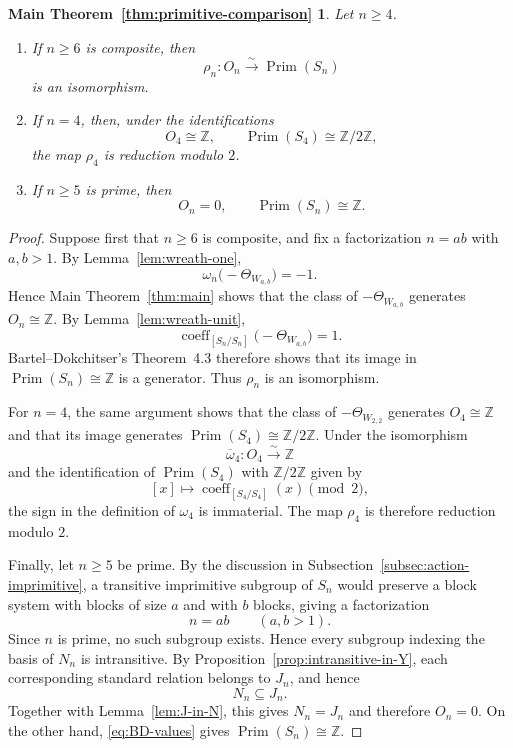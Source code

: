\documentclass[a4paper,11pt]{article}
\numberwithin{equation}{section}
\newtheorem*{primitivecomparisonrestated}{Main Theorem~\ref{thm:primitive-comparison}}
\newcommand{\Z}{\mathbb{Z}}
\newcommand{\Prim}{\operatorname{Prim}}
\newcommand{\coeff}{\operatorname{coeff}}
\begin{document}
\begin{primitivecomparisonrestated}
Let $n\ge4$.
\begin{enumerate}[label=\textup{(\roman*)},leftmargin=3em,labelsep=0.6em]
\item If $n\ge6$ is composite, then
\[
  \rho_n:O_n\xrightarrow{\sim}\Prim(S_n)
\]
is an isomorphism.
\item If $n=4$, then, under the identifications
\[
  O_4\cong\Z,
  \qquad
  \Prim(S_4)\cong\Z/2\Z,
\]
the map $\rho_4$ is reduction modulo $2$.
\item If $n\ge5$ is prime, then
\[
  O_n=0,
  \qquad
  \Prim(S_n)\cong\Z.
\]
\end{enumerate}
\end{primitivecomparisonrestated}

\begin{proof}
Suppose first that $n\ge6$ is composite, and fix a factorization $n=ab$ with
$a,b>1$. By Lemma~\ref{lem:wreath-one},
\[
  \omega_n\bigl(-\Theta_{W_{a,b}}\bigr)=-1.
\]
Hence Main Theorem~\ref{thm:main} shows that the class of
$-\Theta_{W_{a,b}}$ generates $O_n\cong\Z$. By Lemma~\ref{lem:wreath-unit},
\[
  \coeff_{[S_n/S_n]}\bigl(-\Theta_{W_{a,b}}\bigr)=1.
\]
Bartel--Dokchitser's Theorem~4.3 therefore shows that its image in
$\Prim(S_n)\cong\Z$ is a generator. Thus $\rho_n$ is an isomorphism.

For $n=4$, the same argument shows that the class of $-\Theta_{W_{2,2}}$
generates $O_4\cong\Z$ and that its image generates
$\Prim(S_4)\cong\Z/2\Z$. Under the isomorphism
\[
  \overline\omega_4:O_4\xrightarrow{\sim}\Z
\]
and the identification of $\Prim(S_4)$ with $\Z/2\Z$ given by
\[
  [x]\longmapsto \coeff_{[S_4/S_4]}(x)\pmod 2,
\]
the sign in the definition of $\omega_4$ is immaterial. The map $\rho_4$ is therefore reduction modulo
$2$.

Finally, let $n\ge5$ be prime. By the discussion in
Subsection~\ref{subsec:action-imprimitive}, a transitive imprimitive subgroup
of $S_n$ would preserve a block system with blocks of size $a$ and with $b$
blocks, giving a factorization
\[
  n=ab
  \qquad
  (a,b>1).
\]
Since $n$ is prime, no such subgroup exists. Hence every subgroup indexing the basis of $N_n$ is intransitive. By
Proposition~\ref{prop:intransitive-in-Y}, each corresponding standard
relation belongs to $J_n$, and hence
\[
  N_n\subseteq J_n.
\]
Together with Lemma~\ref{lem:J-in-N}, this gives $N_n=J_n$ and therefore
$O_n=0$. On the other hand, \eqref{eq:BD-values} gives
$\Prim(S_n)\cong\Z$.
\end{proof}
\end{document}
